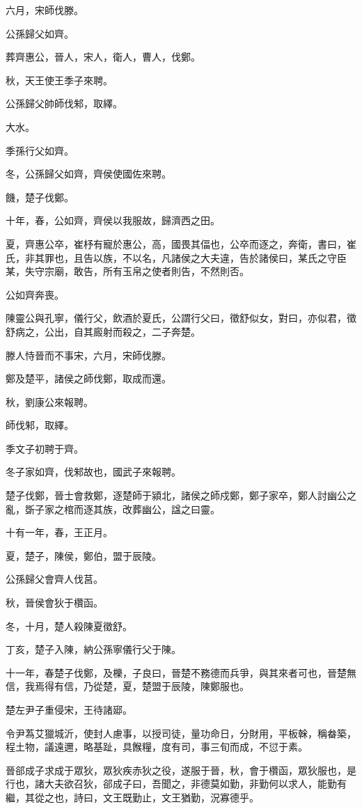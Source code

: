 \begin{pinyinscope}
六月，宋師伐滕。

公孫歸父如齊。

葬齊惠公，晉人，宋人，衛人，曹人，伐鄭。

秋，天王使王季子來聘。

公孫歸父帥師伐邾，取繹。

大水。

季孫行父如齊。

冬，公孫歸父如齊，齊侯使國佐來聘。

饑，楚子伐鄭。

十年，春，公如齊，齊侯以我服故，歸濟西之田。

夏，齊惠公卒，崔杼有寵於惠公，高，國畏其偪也，公卒而逐之，奔衛，書曰，崔氏，非其罪也，且告以族，不以名，凡諸侯之大夫違，告於諸侯曰，某氏之守臣某，失守宗廟，敢告，所有玉帛之使者則告，不然則否。

公如齊奔喪。

陳靈公與孔寧，儀行父，飲酒於夏氏，公謂行父曰，徵舒似女，對曰，亦似君，徵舒病之，公出，自其廄射而殺之，二子奔楚。

滕人恃晉而不事宋，六月，宋師伐滕。

鄭及楚平，諸侯之師伐鄭，取成而還。

秋，劉康公來報聘。

師伐邾，取繹。

季文子初聘于齊。

冬子家如齊，伐邾故也，國武子來報聘。

楚子伐鄭，晉士會救鄭，逐楚師于潁北，諸侯之師戍鄭，鄭子家卒，鄭人討幽公之亂，斲子家之棺而逐其族，改葬幽公，諡之曰靈。

十有一年，春，王正月。

夏，楚子，陳侯，鄭伯，盟于辰陵。

公孫歸父會齊人伐莒。

秋，晉侯會狄于欑函。

冬，十月，楚人殺陳夏徵舒。

丁亥，楚子入陳，納公孫寧儀行父于陳。

十一年，春楚子伐鄭，及櫟，子良曰，晉楚不務德而兵爭，與其來者可也，晉楚無信，我焉得有信，乃從楚，夏，楚盟于辰陵，陳鄭服也。

楚左尹子重侵宋，王待諸郔。

令尹蒍艾獵城沂，使封人慮事，以授司徒，量功命日，分財用，平板榦，稱畚築，程土物，議遠邇，略基趾，具餱糧，度有司，事三旬而成，不愆于素。

晉郤成子求成于眾狄，眾狄疾赤狄之役，遂服于晉，秋，會于欑函，眾狄服也，是行也，諸大夫欲召狄，郤成子曰，吾聞之，非德莫如勤，非勤何以求人，能勤有繼，其從之也，詩曰，文王既勤止，文王猶勤，況寡德乎。


\end{pinyinscope}
